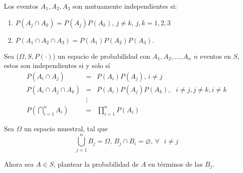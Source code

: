 \begin{definition}
 Los eventos $A_{1},A_{2},A_{3}$ son mutuamente independientes si:
\begin{enumerate}
    \item $P(A_{j}\cap A_{k})=P(A_{j})P(A_{k})$, $j\neq k$, $j,k=1,2,3$
    \item$P(A_{1}\cap A_{2}\cap A_{3})=P(A_{1})P(A_{2})P(A_{3}).$
\end{enumerate}
\end{definition}

\begin{definition}
 Sea ($\Omega,S,P(\cdot )$) un espacio de probabilidad con $A_{1},A_{2},...,A_{n}$ $n$ eventos en $S$, estos son independientes si y solo sí 
\begin{eqnarray*}
P(A_{i}\cap A_{j}) &=&P(A_{i})P(A_{j})\text{, }i\neq j \\
P(A_{i}\cap A_{j}\cap A_{k}) &=&P(A_{i})P(A_{j})P(A_{k}),\text{ }i\neq
j,j\neq k,i\neq k \\
 & \vdots&\\
P\left( \bigcap\limits_{i=1}^{n}A_{i}\right)
&=&\prod\limits_{i=1}^{n}P(A_{i})
\end{eqnarray*}
\end{definition}

Sea $\Omega$ un espacio muestral, tal que 
\begin{equation*}
\bigcup\limits_{j=1}^{n}B_{j}=\Omega \text{, }B_{j}\cap
B_{i}=\varnothing \text{, }\forall \text{ }i\neq j
\end{equation*}

Ahora sea $A\in S$, plantear la probabilidad de $A$ en términos de las $B_{j}$.



